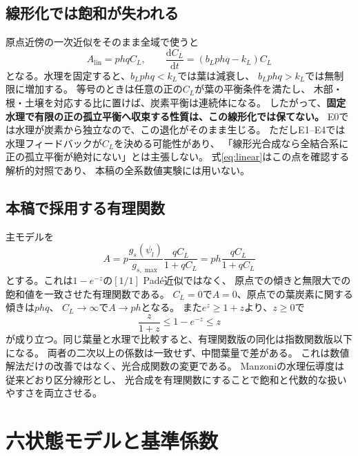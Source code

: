 \documentclass[a4paper,11pt]{ltjsarticle}
\newcommand{\dd}{\mathrm{d}}
\begin{document}
\subsection{線形化では飽和が失われる}
原点近傍の一次近似をそのまま全域で使うと
\begin{equation}\label{eq:linear}
 A_{\mathrm{lin}}=p hqC_L,\qquad
 \frac{\dd C_L}{\dd t}=(b_Lp hq-k_L)C_L
\end{equation}
となる。水理を固定すると、$b_Lp hq<k_L$では葉は減衰し、
$b_Lp hq>k_L$では無制限に増加する。
等号のときは任意の正の$C_L$が葉の平衡条件を満たし、
木部・根・土壌を対応する比に置けば、炭素平衡は連続体になる。
したがって、\textbf{固定水理で有限の正の孤立平衡へ収束する性質は、この線形化では保てない。}
E0では水理が炭素から独立なので、この退化がそのまま生じる。
ただしE1--E4では水理フィードバックが$C_L$を決める可能性があり、
「線形光合成なら全結合系に正の孤立平衡が絶対にない」とは主張しない。
式\eqref{eq:linear}はこの点を確認する解析的対照であり、
本稿の全系数値実験には用いない。

\subsection{本稿で採用する有理関数}
主モデルを
\begin{equation}\label{eq:rational}
 \boxed{A=p\frac{g_s(\psi_l)}{g_{s,\max}}\frac{qC_L}{1+qC_L}=p h\frac{qC_L}{1+qC_L}}
\end{equation}
とする。これは$1-e^{-z}$の$[1/1]$ Pad\'e近似ではなく、
原点での傾きと無限大での飽和値を一致させた有理関数である。
$C_L=0$で$A=0$、原点での葉炭素に関する傾きは$phq$、
$C_L\to\infty$で$A\to ph$となる。
また$e^z\geq1+z$より、$z\geq0$で
\begin{equation}
 \frac{z}{1+z}\leq1-e^{-z}\leq z
\end{equation}
が成り立つ。同じ葉量と水理で比較すると、有理関数版の同化は指数関数版以下になる。
両者の二次以上の係数は一致せず、中間葉量で差がある。
これは数値解法だけの改善ではなく、光合成関数の変更である。
Manzoniの水理伝導度は従来どおり区分線形とし、
光合成を有理関数にすることで飽和と代数的な扱いやすさを両立させる。

\section{六状態モデルと基準係数}
\end{document}
